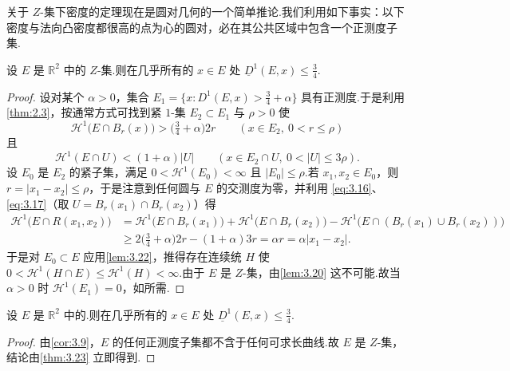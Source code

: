 关于 $Z$-集下密度的定理现在是圆对几何的一个简单推论.我们利用如下事实：以下密度与法向凸密度都很高的点为心的圆对，必在其公共区域中包含一个正测度子集.

\begin{theorem}\label{thm:3.23}
设 $E$ 是 $\mathbb{R}^2$ 中的 $Z$-集.则在几乎所有的 $x\in E$ 处 $\underline{D}^1(E,x)\leq\frac{3}{4}$.
\end{theorem}

\begin{proof}
设对某个 $\alpha>0$，集合 $E_1=\{x:D^1(E,x)>\frac{3}{4}+\alpha\}$ 具有正测度.于是利用\cref{thm:2.3}，按通常方式可找到紧 $1$-集 $E_2\subset E_1$ 与 $\rho>0$ 使
\begin{equation}\label{eq:3.16}
  \mathcal{H}^{1}\bigl(E\cap B_r(x)\bigr)>\bigl(\tfrac{3}{4}+\alpha\bigr)2r
  \qquad(x\in E_2,\ 0<r\leq\rho)
\end{equation}
且
\begin{equation}\label{eq:3.17}
  \mathcal{H}^{1}(E\cap U)<(1+\alpha)|U|
  \qquad(x\in E_2\cap U,\ 0<|U|\leq 3\rho).
\end{equation}
设 $E_0$ 是 $E_2$ 的紧子集，满足 $0<\mathcal{H}^1(E_0)<\infty$ 且 $|E_0|\leq\rho$.若 $x_1,x_2\in E_0$，则 $r=|x_1-x_2|\leq\rho$，于是注意到任何圆与 $E$ 的交测度为零，并利用 \eqref{eq:3.16}、\eqref{eq:3.17}（取 $U=B_r(x_1)\cap B_r(x_2)$）得
\begin{align*}
  \mathcal{H}^{1}\bigl(E\cap R(x_1,x_2)\bigr)
  &=\mathcal{H}^{1}\bigl(E\cap B_r(x_1)\bigr)+\mathcal{H}^{1}\bigl(E\cap B_r(x_2)\bigr)
  -\mathcal{H}^{1}\bigl(E\cap(B_r(x_1)\cup B_r(x_2))\bigr)\\
  &\geq 2\bigl(\tfrac{3}{4}+\alpha\bigr)2r-(1+\alpha)3r=\alpha r=\alpha|x_1-x_2|.
\end{align*}
于是对 $E_0\subset E$ 应用\cref{lem:3.22}，推得存在连续统 $H$ 使 $0<\mathcal{H}^1(H\cap E)\leq\mathcal{H}^1(H)<\infty$.由于 $E$ 是 $Z$-集，由\cref{lem:3.20} 这不可能.故当 $\alpha>0$ 时 $\mathcal{H}^1(E_1)=0$，如所需.
\end{proof}

\begin{corollary}\label{cor:3.24}
设 $E$ 是 $\mathbb{R}^2$ 中的.则在几乎所有的 $x\in E$ 处 $\underline{D}^1(E,x)\leq\frac{3}{4}$.
\end{corollary}

\begin{proof}
由\cref{cor:3.9}，$E$ 的任何正测度子集都不含于任何可求长曲线.故 $E$ 是 $Z$-集，结论由\cref{thm:3.23} 立即得到.
\end{proof}

